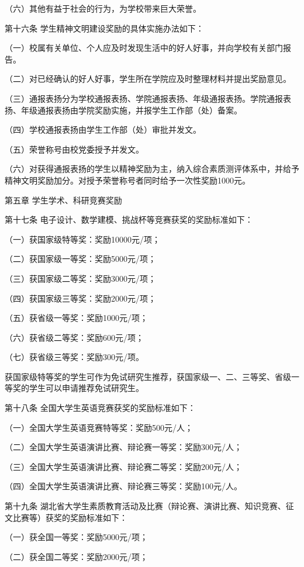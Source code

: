 \documentclass[UTF8,12pt,a4paper]{report}
\begin{document}
（六）其他有益于社会的行为，为学校带来巨大荣誉。

第十六条  学生精神文明建设奖励的具体实施办法如下：

（一）校属有关单位、个人应及时发现生活中的好人好事，并向学校有关部门报告。

（二）对已经确认的好人好事，学生所在学院应及时整理材料并提出奖励意见。

（三）通报表扬分为学校通报表扬、学院通报表扬、年级通报表扬。学院通报表扬、年级通报表扬由学院奖励实施，并报学生工作部（处）备案。

（四）学校通报表扬由学生工作部（处）审批并发文。

（五）荣誉称号由校党委授予并发文。

（六）对获得通报表扬的学生以精神奖励为主，纳入综合素质测评体系中，并给予精神文明奖励加分。对授予荣誉称号者同时给予一次性奖励1000元。



第五章  学生学术、科研竞赛奖励

第十七条  电子设计、数学建模、挑战杯等竞赛获奖的奖励标准如下：

（一）获国家级特等奖：奖励10000元/项；

（二）获国家级一等奖：奖励5000元/项；

（三）获国家级二等奖：奖励3000元/项；

（四）获国家级三等奖：奖励2000元/项；

（五）获省级一等奖：奖励1000元/项；

（六）获省级二等奖：奖励600元/项；

（七）获省级三等奖：奖励300元/项。

获国家级特等奖的学生可作为免试研究生推荐，获国家级一、二、三等奖、省级一等奖的学生可以申请推荐免试研究生。

第十八条  全国大学生英语竞赛获奖的奖励标准如下：

（一）全国大学生英语竞赛特等奖：奖励500元/人；

（二）全国大学生英语演讲比赛、辩论赛一等奖：奖励300元/人；

（三）全国大学生英语演讲比赛、辩论赛二等奖：奖励200元/人；

（四）全国大学生英语演讲比赛、辩论赛三等奖：奖励100元/人。

第十九条  湖北省大学生素质教育活动及比赛（辩论赛、演讲比赛、知识竞赛、征文比赛等）获奖的奖励标准如下：

（一）获全国一等奖：奖励5000元/项；

（二）获全国二等奖：奖励2000元/项；
\end{document}
